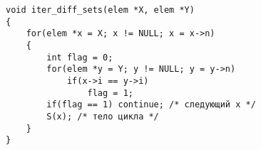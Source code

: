 \begin{lstlisting}[caption={Итератор объединения дизъюнктивных множеств}, label=p_47_iter_un_sets, escapechar=\%]
void iter_diff_sets(elem *X, elem *Y)
{
	for(elem *x = X; x != NULL; x = x->n)
	{
		int flag = 0;
		for(elem *y = Y; y != NULL; y = y->n)
			if(x->i == y->i)
				flag = 1;
		if(flag == 1) continue; /* следующий x */
		S(x); /* тело цикла */
	}
}
\end{lstlisting}
